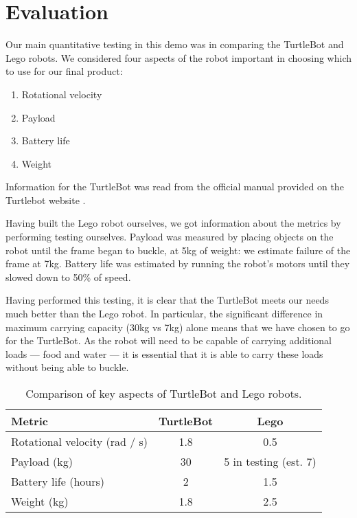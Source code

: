 \documentclass{article}
\begin{document}
\section{Evaluation}
Our main quantitative testing in this demo was in comparing the TurtleBot and Lego robots. We considered four aspects of the robot important in choosing which to use for our final product:
\begin{enumerate}
\item Rotational velocity
\item Payload
\item Battery life
\item Weight
\end{enumerate}

Information for the TurtleBot was read from the official manual provided on the Turtlebot website \cite{turtle}.

Having built the Lego robot ourselves, we got information about the metrics by performing testing ourselves. Payload was measured by placing objects on the robot until the frame began to buckle, at 5kg of weight: we estimate failure of the frame at 7kg. Battery life was estimated by running the robot's motors until they slowed down to 50\% of speed. 

Having performed this testing, it is clear that the TurtleBot meets our needs much better than the Lego robot. In particular, the significant difference in maximum carrying capacity (30kg vs 7kg) alone means that we have chosen to go for the TurtleBot. As the robot will need to be capable of carrying additional loads --- food and water --- it is essential that it is able to carry these loads without being able to buckle.


\begin{table}[h]
\vskip 3mm
\begin{center}
\begin{small}
\begin{sc}
\begin{tabular}{lcc}
\hline
\abovespace\belowspace
Metric & TurtleBot & Lego \\
\hline
  Rotational velocity (rad / s) & 1.8 & 0.5 \\
  Payload (kg) & 30 & 5 in testing (est. 7) \\
  Battery life (hours) & 2 & 1.5 \\
  Weight (kg) & 1.8 & 2.5 
\end{tabular}
\end{sc}
\end{small}
\caption{Comparison of key aspects of TurtleBot and Lego robots.}
\label{tab:sample-table}
\end{center}
\vskip -3mm
\end{table}
\end{document}
